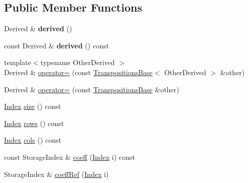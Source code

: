 \subsection*{Public Member Functions}
\begin{DoxyCompactItemize}
\item 
\mbox{\label{class_eigen_1_1_transpositions_base_a108277feb5d561ccd82a92b54d551131}} 
Derived \& {\bfseries derived} ()
\item 
\mbox{\label{class_eigen_1_1_transpositions_base_a170ba41d65a332d9e61f891ec6206ad9}} 
const Derived \& {\bfseries derived} () const
\item 
{\footnotesize template$<$typename Other\+Derived $>$ }\\Derived \& \hyperlink{class_eigen_1_1_transpositions_base_a476b5c653c6842e3e4d0104f7f888817}{operator=} (const \hyperlink{class_eigen_1_1_transpositions_base}{Transpositions\+Base}$<$ Other\+Derived $>$ \&other)
\item 
Derived \& \hyperlink{class_eigen_1_1_transpositions_base_a8d12862df7ffdb0f2cfd81ab122847ca}{operator=} (const \hyperlink{class_eigen_1_1_transpositions_base}{Transpositions\+Base} \&other)
\item 
\hyperlink{class_eigen_1_1_transpositions_base_a3f5f06118b419e8e6ccbe49ed5b4c91f}{Index} \hyperlink{class_eigen_1_1_transpositions_base_a6888d6261a9cc24ee8607496e610a5a3}{size} () const
\item 
\hyperlink{class_eigen_1_1_transpositions_base_a3f5f06118b419e8e6ccbe49ed5b4c91f}{Index} \hyperlink{class_eigen_1_1_transpositions_base_a8c073f17542a8fc9ac581c17f6cdc8d3}{rows} () const
\item 
\hyperlink{class_eigen_1_1_transpositions_base_a3f5f06118b419e8e6ccbe49ed5b4c91f}{Index} \hyperlink{class_eigen_1_1_transpositions_base_acb6f58081640839bd4102b75bdeec562}{cols} () const
\item 
const Storage\+Index \& \hyperlink{class_eigen_1_1_transpositions_base_aae1d3847b107e518c9f2b6010a6b635a}{coeff} (\hyperlink{class_eigen_1_1_transpositions_base_a3f5f06118b419e8e6ccbe49ed5b4c91f}{Index} i) const
\item 
Storage\+Index \& \hyperlink{class_eigen_1_1_transpositions_base_a97dda1bb4ff8bdd83d8e97af3e590252}{coeff\+Ref} (\hyperlink{class_eigen_1_1_transpositions_base_a3f5f06118b419e8e6ccbe49ed5b4c91f}{Index} i)
\item 

\end{DoxyCompactItemize}
